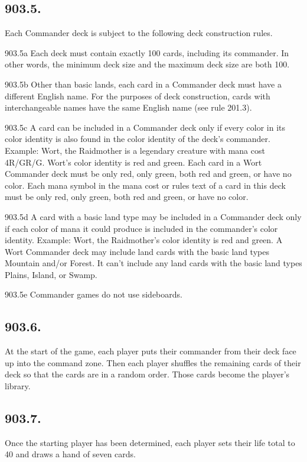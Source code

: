 \subsection*{903.5.}
Each Commander deck is subject to the following deck construction rules.

903.5a Each deck must contain exactly 100 cards, including its commander. In other words, the minimum deck size and the maximum deck size are both 100.

903.5b Other than basic lands, each card in a Commander deck must have a different English name. For the purposes of deck construction, cards with interchangeable names have the same English name (see rule 201.3).

903.5c A card can be included in a Commander deck only if every color in its color identity is also found in the color identity of the deck’s commander.
Example: Wort, the Raidmother is a legendary creature with mana cost {4}{R/G}{R/G}. Wort’s color identity is red and green. Each card in a Wort Commander deck must be only red, only green, both red and green, or have no color. Each mana symbol in the mana cost or rules text of a card in this deck must be only red, only green, both red and green, or have no color.

903.5d A card with a basic land type may be included in a Commander deck only if each color of mana it could produce is included in the commander’s color identity.
Example: Wort, the Raidmother’s color identity is red and green. A Wort Commander deck may include land cards with the basic land types Mountain and/or Forest. It can’t include any land cards with the basic land types Plains, Island, or Swamp.

903.5e Commander games do not use sideboards.

\subsection*{903.6.}
At the start of the game, each player puts their commander from their deck face up into the command zone. Then each player shuffles the remaining cards of their deck so that the cards are in a random order. Those cards become the player’s library.

\subsection*{903.7.}
Once the starting player has been determined, each player sets their life total to 40 and draws a hand of seven cards.

